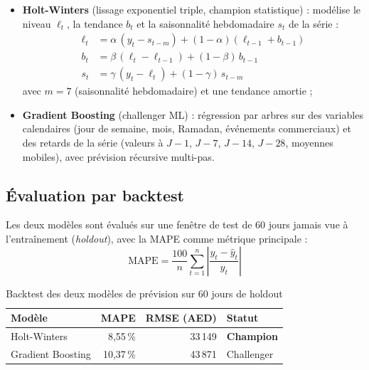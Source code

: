 \documentclass[12pt,a4paper]{report}
\begin{document}
\begin{itemize}
  \item \textbf{Holt-Winters} (lissage exponentiel triple, champion
    statistique) : modélise le niveau $\ell_t$, la tendance $b_t$ et la
    saisonnalité hebdomadaire $s_t$ de la série :
    \begin{align}
      \ell_t &= \alpha\,(y_t - s_{t-m}) + (1-\alpha)(\ell_{t-1} + b_{t-1})\\
      b_t &= \beta\,(\ell_t - \ell_{t-1}) + (1-\beta)\,b_{t-1}\\
      s_t &= \gamma\,(y_t - \ell_t) + (1-\gamma)\,s_{t-m}
    \end{align}
    avec $m=7$ (saisonnalité hebdomadaire) et une tendance amortie ;
  \item \textbf{Gradient Boosting} (challenger ML) : régression par arbres sur
    des variables calendaires (jour de semaine, mois, Ramadan, événements
    commerciaux) et des retards de la série (valeurs à $J-1$, $J-7$, $J-14$,
    $J-28$, moyennes mobiles), avec prévision récursive multi-pas.
\end{itemize}

\subsection{Évaluation par backtest}

Les deux modèles sont évalués sur une fenêtre de test de 60 jours jamais vue à
l'entraînement (\textit{holdout}), avec la MAPE comme métrique principale :
\begin{equation}
  \mathrm{MAPE} = \frac{100}{n}\sum_{t=1}^{n}
  \left|\frac{y_t - \hat{y}_t}{y_t}\right|
\end{equation}

\begin{table}[htbp]
  \centering
  \begin{tabular}{@{}lrrl@{}}
    \toprule
    \textbf{Modèle} & \textbf{MAPE} & \textbf{RMSE (AED)} & \textbf{Statut} \\
    \midrule
    Holt-Winters      & 8{,}55\,\% & 33\,149 & \textbf{Champion} \\
    Gradient Boosting & 10{,}37\,\% & 43\,871 & Challenger \\
    \bottomrule
  \end{tabular}
  \caption{Backtest des deux modèles de prévision sur 60 jours de holdout}
  \label{tab:backtest}
\end{table}
\end{document}

